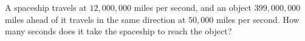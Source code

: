A spaceship travels at $12{,}000{,}000$ miles per second, and an object $399{,}000{,}000$ miles ahead of it travels in the same direction at $50{,}000$ miles per second. How many seconds does it take the spaceship to reach the object?
